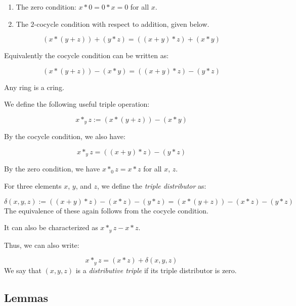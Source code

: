 \documentclass[10pt]{amsart}
\begin{document}
\begin{enumerate}
\item The zero condition: $x * 0 = 0 * x = 0$ for all $x$.
\item The $2$-cocycle condition with respect to addition, given below.
\end{enumerate}

\begin{equation}
  (x * (y + z)) + (y * z) = ((x + y) * z) + (x * y)
\end{equation}

Equivalently the cocycle condition can be written as:

\begin{equation}
  (x * (y + z)) - (x * y) = ((x + y) * z) - (y * z)
\end{equation}

Any ring is a cring.

We define the following useful triple operation:

\begin{equation}\label{eq:starone}
  x *_y z := (x * (y + z)) - (x * y)
\end{equation}

By the cocycle condition, we also have:

\begin{equation}\label{eq:startwo}
  x *_y z = ((x + y) * z) - (y * z)
\end{equation}

By the zero condition, we have $x *_0 z = x * z$ for all $x$, $z$.

For three elements $x$, $y$, and $z$, we define the {\em triple
  distributor} as:

\begin{equation}\label{eq:tripledistributordef}
  \delta(x,y,z) := ((x + y) * z) - (x * z) - (y * z) = (x * (y + z)) - (x * z) - (y * z)
\end{equation}
The equivalence of these again follows from the cocycle condition.

It can also be characterized as $x *_y z - x * z$.

Thus, we can also write:

\begin{equation}
  x *_y z = (x * z) + \delta(x,y,z)
\end{equation}
We say that $(x,y,z)$ is a {\em distributive triple} if its triple
distributor is zero.
\subsection{Lemmas}
\end{document}
